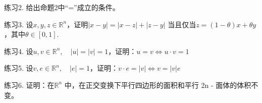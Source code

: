 \documentclass{article}
\begin{document}
\vspace{10pt}

练习2. 给出命题2中“=”成立的条件。

\vspace{30pt}

练习3. 设\(x, y, z \in \mathbb{R}^n\)，证明\(|x - y|= |x - z|+ |z - y|\) 当且仅当\(z =(1 - \theta )x + \theta y\)，其中\(\theta \in [0,1]\).

\vspace{30pt}

练习4. 设\(u, v \in \mathbb{R}^n,\quad |u|= |v| = 1\)，证明：\(u = v \iff u \cdot v = 1\)

\vspace{30pt}

练习5. 设\(v, e \in \mathbb{R}^n,\quad |e|= 1\)，证明：\(v \cdot e = |v| \iff v = |v|e\)

\vspace{30pt}

练习6. 证明：在\(\mathbb{R}^n\) 中，在正交变换下平行四边形的面积和平行 2n - 面体的体积不变。
\end{document}
